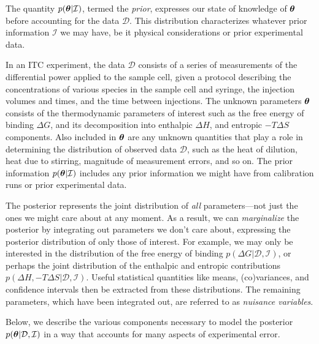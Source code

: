 \documentclass[aps,pre,twocolumn,nofootinbib,superscriptaddress,linenumbers]{revtex4-1}
\newcommand{\bfv}[1]{{\mbox{\boldmath{$#1$}}}}
\begin{document}
The quantity $p(\bfv{\theta} | \mathcal{I})$, termed the \emph{prior}, expresses our state of knowledge of $\bfv{\theta}$ before accounting for the data $\mathcal{D}$.
This distribution characterizes whatever prior information $\mathcal{I}$ we may have, be it physical considerations or prior experimental data.

In an ITC experiment, the data $\mathcal{D}$ consists of a series of measurements of the differential power applied to the sample cell, given a protocol describing the concentrations of various species in the sample cell and syringe, the injection volumes and times, and the time between injections.
The unknown parameters $\bfv{\theta}$ consists of the thermodynamic parameters of interest such as the free energy of binding $\Delta G$, and its decomposition into enthalpic $\Delta H$, and entropic $-T\Delta S$ components.
Also included in $\bfv{\theta}$ are any unknown quantities that play a role in determining the distribution of observed data $\mathcal{D}$, such as the heat of dilution, heat due to stirring, magnitude of measurement errors, and so on.
The prior information $p(\bfv{\theta} | \mathcal{I})$ includes any prior information we might have from calibration runs or prior experimental data.

The posterior represents the joint distribution of \emph{all} parameters---not just the ones we might care about at any moment.
As a result, we can \emph{marginalize} the posterior by integrating out parameters we don't care about, expressing the posterior distribution of only those of interest.
For example, we may only be interested in the distribution of the free energy of binding $p(\Delta G | \mathcal{D}, \mathcal{I})$, or perhaps the joint distribution of the enthalpic and entropic contributions $p(\Delta H, - T \Delta S | \mathcal{D}, \mathcal{I})$.
Useful statistical quantities like means, (co)variances, and confidence intervals then be extracted from these distributions.
The remaining parameters, which have been integrated out, are referred to as \emph{nuisance variables}.

Below, we describe the various components necessary to model the posterior $p(\bfv{\theta} | \mathcal{D}, \mathcal{I})$ in a way that accounts for many aspects of experimental error.

\end{document}

